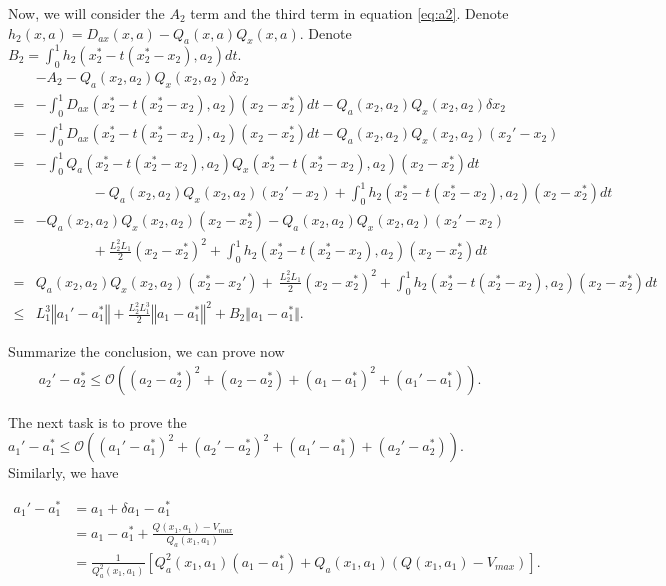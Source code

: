 \documentclass{article} %
\newcommand{\llVert}{\left\Vert}
\newcommand{\rrVert}{\right\Vert}
\newcommand{\vmax}{V_{max}}
\newcommand{\bigspace}{\qquad\qquad}
\begin{document}
Now, we will consider the $A_2$ term and the third term in equation \ref{eq:a2}. Denote $h_2(x,a) = D_{ax}(x,a) - Q_a(x,a)Q_x(x,a)$. Denote $B_2 = \int_0^1 h_2(x_2^*-t(x_2^* - x_2), a_2) dt$.
\begin{align}
    &  - A_2  - Q_a(x_2,a_2)Q_x(x_2,a_2)\delta x_2 \\
    =&   -   \int_0^1   D_{ax}(x_2^*-t(x_2^* - x_2), a_2)(x_2-x_2^*)dt  - Q_a(x_2,a_2)Q_x(x_2,a_2)\delta x_2  \\
    =&   -   \int_0^1   D_{ax}(x_2^*-t(x_2^* - x_2), a_2)(x_2-x_2^*)dt  - Q_a(x_2,a_2)Q_x(x_2,a_2)\left(x_2' -x_2\right)\\
    = &  -   \int_0^1   Q_a(x_2^*-t(x_2^* - x_2), a_2)Q_x(x_2^*-t(x_2^* - x_2), a_2)(x_2-x_2^*)dt  \\
    & \bigspace - Q_a(x_2,a_2)Q_x(x_2,a_2)\left(x_2' -x_2\right) + \int_0^1 h_2(x_2^*-t(x_2^* - x_2), a_2)(x_2 - x_2^*)dt \\
   = &  - Q_a(x_2, a_2)Q_x(x_2,a_2)(x_2-x_2^*)  - Q_a(x_2,a_2)Q_x(x_2,a_2)\left(x_2' -x_2\right) \\
   & \bigspace + \frac{ L_2^2L_1}{2}(x_2-x_2^*)^2 + \int_0^1 h_2(x_2^*-t(x_2^* - x_2), a_2)(x_2 - x_2^*)dt \\
   = &  Q_a(x_2, a_2)Q_x(x_2,a_2)(x_2^*-x_2') +  \ \frac{ L_2^2L_1}{2} (x_2-x_2^*)^2 + \int_0^1 h_2(x_2^*-t(x_2^* - x_2), a_2)(x_2 - x_2^*)dt \\
   \le &  L_1^3\llVert a_1'- a_1^*    \rrVert + \frac{ L_2^2L_1^3}{2} \llVert a_1 - a_1^* \rrVert^2 + B_2 \Vert a_1-a_1^* \Vert.
\end{align}                             


Summarize the conclusion,  we can prove now
\begin{align}
    a_2'-a_2^* \le   \mathcal{O}\left( (a_2 - a_2^*)^2 +  (a_2 - a_2^*) +  (a_1 - a_1^*)^2 +  (a_1'-a_1^*)  \right)  .
\end{align}

The next task is to prove the $ a_1'- a_1^*     \le \mathcal{O}\left (\left( a_1'- a_1^*    \right) ^2 + \left( a_2'- a_2^*    \right) ^2  + \left( a_1'- a_1^*    \right)   + \left( a_2'- a_2^*    \right)   \right)$. Similarly, we have

\begin{align}
    a_1' -a_1^*  &=a_1 + \delta a_1 -a_1^* \\
                    &= a_1 -  a_1^* + \frac{Q(x_1, a_1)- \vmax}{Q_a(x_1,a_1)} \\ 
                    &= \frac{1}{Q_a^2(x_1, a_1)}\left[Q_a^2(x_1, a_1)(a_1 - a_1^*) + Q_a(x_1,a_1)(Q(x_1, a_1)-\vmax) \right].
\end{align}
\end{document}
